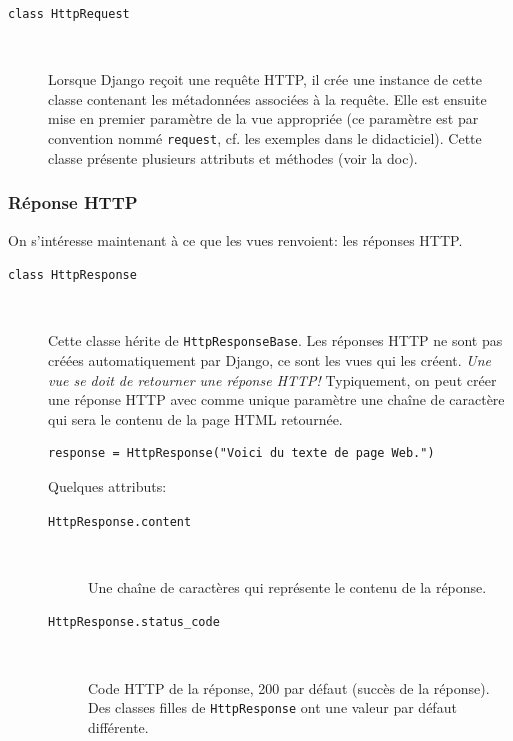 \documentclass[a4paper, 10pt]{article}
\begin{document}
{\begin{description}
    \item[\texttt{class HttpRequest}]~

    Lorsque Django reçoit une requête HTTP, il crée une instance de cette classe contenant les métadonnées associées à la requête. Elle est ensuite mise en premier paramètre de la vue appropriée (ce paramètre est par convention nommé \texttt{request}, cf. les exemples dans le didacticiel). Cette classe présente plusieurs attributs et méthodes (voir la doc).
\end{description}

\subsubsection{Réponse HTTP}
On  s'intéresse maintenant à ce que les vues renvoient: les réponses HTTP.

\begin{description}
    \item[\texttt{class HttpResponse}]~

    Cette classe hérite de \texttt{HttpResponseBase}. Les réponses HTTP ne sont pas créées automatiquement par Django, ce sont les vues qui les créent. \emph{Une vue se doit de retourner une réponse HTTP!} Typiquement, on peut créer une réponse HTTP avec comme unique paramètre une chaîne de caractère qui sera le contenu de la page HTML retournée.

    \begin{verbatim}
response = HttpResponse("Voici du texte de page Web.")
    \end{verbatim}

    Quelques attributs:

    \begin{description}
        \item[\texttt{HttpResponse.content}]~

        Une chaîne de caractères qui représente le contenu de la réponse.

        \item[\texttt{HttpResponse.status_code}]~

        Code HTTP de la réponse, 200 par défaut (succès de la réponse). Des classes filles de \texttt{HttpResponse} ont une valeur par défaut différente.
    \end{description}


\end{description}}
\end{document}
